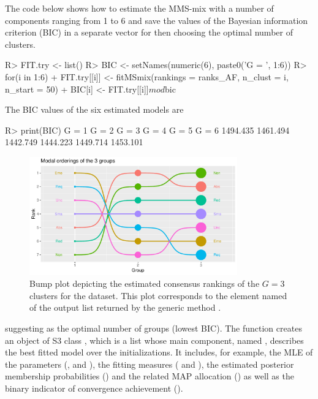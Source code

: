 The code below shows how to estimate the MMS-mix with a number of components ranging from 1 to 6 and save the values of the Bayesian information criterion (BIC) in a separate vector for then choosing the optimal number of clusters.
\begin{example}
R> FIT.try <- list()
R> BIC <- setNames(numeric(6), paste0('G = ', 1:6))
R> for(i in 1:6){
+    FIT.try[[i]] <- fitMSmix(rankings = ranks_AF, n_clust = i, n_start = 50)
+    BIC[i] <- FIT.try[[i]]$mod$bic}
\end{example}
The BIC values of the six estimated models are
\begin{example}
R> print(BIC)
   G = 1    G = 2    G = 3    G = 4    G = 5    G = 6
1494.435 1461.494 1442.749 1444.223 1449.714 1453.101
\end{example}
\begin{figure}[t]
\centering
\includegraphics[width=0.8\textwidth]{figures/RJ2025_paper_cons.pdf}
\caption{Bump plot depicting the estimated consensus rankings of the ${G}=3$ clusters for the  dataset. This plot corresponds to the element named  of the output list returned by the generic method .}
 \label{f:antifr_plot1}
\end{figure}
suggesting  as the optimal number of groups (lowest BIC).
The function  creates an object of S3 class , which is a list whose main component, named  , describes the best fitted model over the  initializations. It includes, for example, the MLE of the parameters (,  and ), the fitting measures ( and ), the estimated posterior membership probabilities () and the related MAP allocation () as well as the binary indicator of convergence achievement ().

